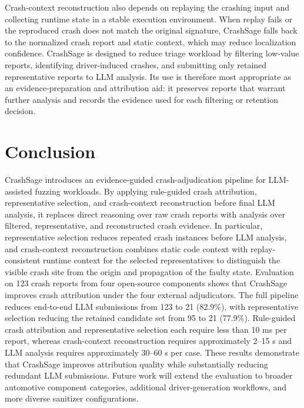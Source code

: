 \documentclass[pdflatex,sn-basic]{sn-jnl}%
\theoremstyle{thmstyleone}%
\theoremstyle{thmstyletwo}%
\theoremstyle{thmstylethree}%
\begin{document}
Crash-context reconstruction also depends on replaying the crashing input and collecting runtime state in a stable execution environment. When replay fails or the reproduced crash does not match the original signature, CrashSage falls back to the normalized crash report and static context, which may reduce localization confidence. CrashSage is designed to reduce triage workload by filtering low-value reports, identifying driver-induced crashes, and submitting only retained representative reports to LLM analysis. Its use is therefore most appropriate as an evidence-preparation and attribution aid: it preserves reports that warrant further analysis and records the evidence used for each filtering or retention decision.

\FloatBarrier

\section{Conclusion}
\label{sec:conclusion}

CrashSage introduces an evidence-guided crash-adjudication pipeline for LLM-assisted fuzzing workloads. By applying rule-guided crash attribution, representative selection, and crash-context reconstruction before final LLM analysis, it replaces direct reasoning over raw crash reports with analysis over filtered, representative, and reconstructed crash evidence. In particular, representative selection reduces repeated crash instances before LLM analysis, and crash-context reconstruction combines static code context with replay-consistent runtime context for the selected representatives to distinguish the visible crash site from the origin and propagation of the faulty state. Evaluation on 123 crash reports from four open-source components shows that CrashSage improves crash attribution under the four external adjudicators. The full pipeline reduces end-to-end LLM submissions from 123 to 21 (82.9\%), with representative selection reducing the retained candidate set from 95 to 21 (77.9\%). Rule-guided crash attribution and representative selection each require less than 10 ms per report, whereas crash-context reconstruction requires approximately 2--15 s and LLM analysis requires approximately 30--60 s per case. These results demonstrate that CrashSage improves attribution quality while substantially reducing redundant LLM submissions. Future work will extend the evaluation to broader automotive component categories, additional driver-generation workflows, and more diverse sanitizer configurations.
\end{document}
